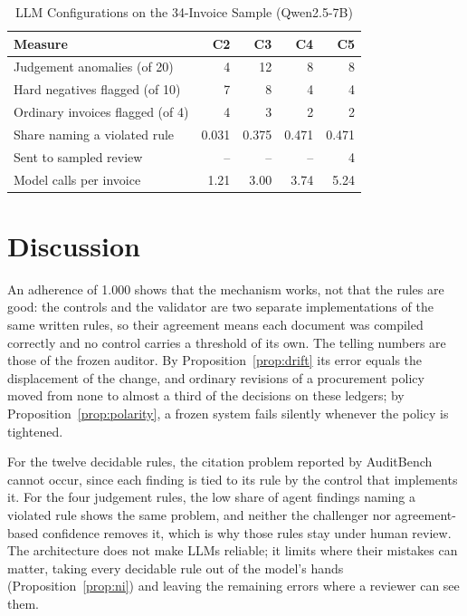 \documentclass[9pt,a4paper,twocolumn]{extarticle}
\newcommand{\tablefont}{\fontsize{8}{9.5}\selectfont}
\begin{document}
\begin{table}[t]
\caption{LLM Configurations on the 34-Invoice Sample (Qwen2.5-7B)}
\label{tab:llm}
\centering\tablefont\setlength{\tabcolsep}{3.4pt}
\begin{tabular}{L{3.7cm}rrrr}
\toprule
Measure & C2 & C3 & C4 & C5\\
\midrule
Judgement anomalies (of 20) & 4 & 12 & 8 & 8 \\
Hard negatives flagged (of 10) & 7 & 8 & 4 & 4 \\
Ordinary invoices flagged (of 4) & 4 & 3 & 2 & 2 \\
Share naming a violated rule & 0.031 & 0.375 & 0.471 & 0.471 \\
Sent to sampled review & -- & -- & -- & 4 \\
Model calls per invoice & 1.21 & 3.00 & 3.74 & 5.24 \\
\bottomrule
\end{tabular}
\end{table}

\section{Discussion}
An adherence of 1.000 shows that the mechanism works, not that the rules are good: the controls and the validator are two separate implementations of the same written rules, so their agreement means each document was compiled correctly and no control carries a threshold of its own. The telling numbers are those of the frozen auditor. By Proposition~\ref{prop:drift} its error equals the displacement of the change, and ordinary revisions of a procurement policy moved from none to almost a third of the decisions on these ledgers; by Proposition~\ref{prop:polarity}, a frozen system fails silently whenever the policy is tightened.

For the twelve decidable rules, the citation problem reported by AuditBench cannot occur, since each finding is tied to its rule by the control that implements it. For the four judgement rules, the low share of agent findings naming a violated rule shows the same problem, and neither the challenger nor agreement-based confidence removes it, which is why those rules stay under human review. The architecture does not make LLMs reliable; it limits where their mistakes can matter, taking every decidable rule out of the model's hands (Proposition~\ref{prop:ni}) and leaving the remaining errors where a reviewer can see them.
\end{document}

